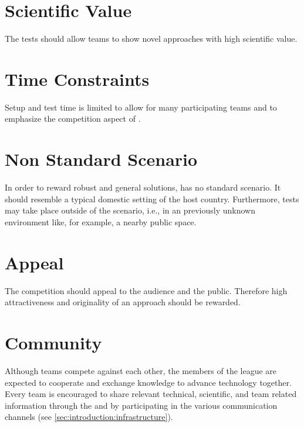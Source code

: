 \section{Scientific Value}
\label{sec:concepts:scientificvalue}
The tests should allow teams to show novel approaches with high scientific value.

\section{Time Constraints}
\label{sec:concepts:timeconstraints}
Setup and test time is limited to allow for many participating teams and to emphasize the competition aspect of \AtHome{}.

\section{Non Standard Scenario}
\label{sec:concepts:nonstandardscenario}
In order to reward robust and general solutions, \RoboCup\AtHome{} has no standard scenario. It should resemble a typical domestic setting of the host country. Furthermore, tests may take place outside of the scenario, i.e., in an previously unknown environment like, for example, a nearby public space.

\section{Appeal}
\label{sec:concepts:appel}
The competition should appeal to the audience and the public. Therefore high attractiveness and originality of an approach should be rewarded.

\section{Community}
\label{sec:concepts:community}
Although teams compete against each other, the members of the \AtHome{} league are expected to cooperate and exchange knowledge to advance technology together. Every team is encouraged to share relevant technical, scientific, and team related information through the \TDP{} and by participating in the various communication channels (see \ref{sec:introduction:infrastructure}).


